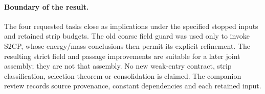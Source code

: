 \documentclass[11pt]{article}
\theoremstyle{remark}\newtheorem{remark}[theorem]{Remark}
\begin{document}
\paragraph{Boundary of the result.}
The four requested tasks close as implications under the
specified stopped inputs and retained strip budgets.
The old coarse field guard was used only to invoke S2CP,
whose energy/mass conclusions then permit its explicit
refinement. The resulting strict field and passage
improvements are suitable for a later joint assembly;
they are not that assembly. No new weak-entry contract,
strip classification, selection theorem or consolidation
is claimed. The companion review records source provenance,
constant dependencies and each retained input.
\end{document}
